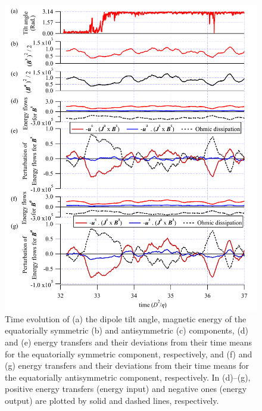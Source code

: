 \begin{figure}[ht]
\hspace*{\fill}
\includegraphics*[width=120mm]
{Figures/retry1_1_Mfluxes_2.pdf}
\hspace*{\fill}
\caption{
Time evolution of (a) the dipole tilt angle, magnetic energy of the equatorially symmetric (b) and antisymmetric (c) components, (d) and (e) energy transfers and their deviations from their time means for the equatorially symmetric component, respectively, and (f) and (g) energy transfers and their deviations from their time means for the equatorially antisymmetric component, respectively.
In (d)--(g), positive energy transfers (energy input) and negative ones (energy output) are plotted by solid and dashed lines, respectively.
}
\label{fig:mag_energy_flux_evolution_retry1_1}
\end{figure}